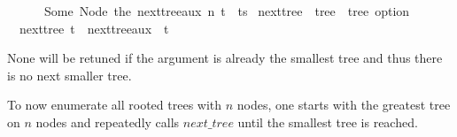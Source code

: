 \begin{isabellebox}
    \ \ \ \ \ \ Some\ {\isacharparenleft}{\kern0pt}Node\ {\isacharparenleft}{\kern0pt}the\ {\isacharparenleft}{\kern0pt}next{\isacharunderscore}{\kern0pt}tree{\isacharunderscore}{\kern0pt}aux\ n\ t{\isacharparenright}{\kern0pt}\ {\isacharhash}{\kern0pt}\ ts{\isacharparenright}{\kern0pt}{\isacharparenright}{\kern0pt}{\isachardoublequoteclose}\isanewline
    \isanewline
    \isamarkupfalse%
    \ next{\isacharunderscore}{\kern0pt}tree\ {\isacharcolon}{\kern0pt}{\isacharcolon}{\kern0pt}\ {\isachardoublequoteopen}tree\ {\isasymRightarrow}\ tree\ option{\isachardoublequoteclose}\ \isanewline
    \ \ {\isachardoublequoteopen}next{\isacharunderscore}{\kern0pt}tree\ t\ {\isacharequal}{\kern0pt}\ next{\isacharunderscore}{\kern0pt}tree{\isacharunderscore}{\kern0pt}aux\ {}\ t{\isachardoublequoteclose}
\end{isabellebox}

None will be retuned if the argument is already the smallest tree and thus there is no next smaller tree.

To now enumerate all rooted trees with $n$ nodes,
one starts with the greatest tree on $n$ nodes and repeatedly calls $next\_tree$ until the smallest tree is reached.

